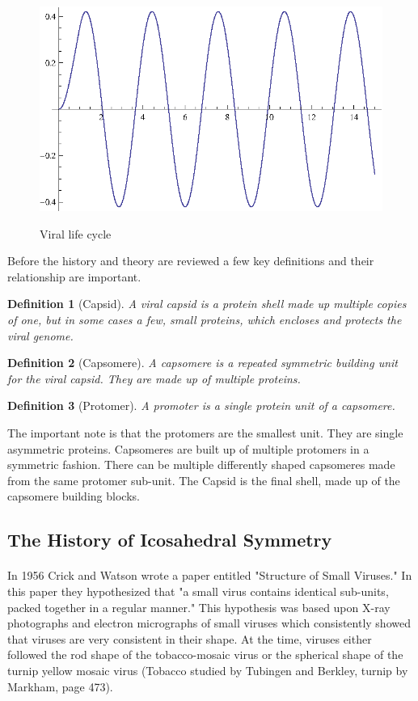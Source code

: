 \documentclass[12pt,letter]{article}
\newtheorem*{definition*}{Definition}
\begin{document}
\begin{figure}[h]
	\caption{Viral life cycle}
	\centering
	\includegraphics{place_holder.eps}
	\label{fig:virus_types}
\end{figure}

Before the history and theory are reviewed a few key definitions and their relationship are important.

\begin{definition*}[Capsid]
A viral capsid is a protein shell made up multiple copies of one, but in some cases a few, small proteins, which encloses and protects the viral genome.
\end{definition*}
\begin{definition*}[Capsomere]
A capsomere is a repeated symmetric building unit for the viral capsid. They are made up of multiple proteins.
\end{definition*}
\begin{definition*}[Protomer]
A promoter is a single protein unit of a capsomere.
\end{definition*}

The important note is that the protomers are the smallest unit. They are single asymmetric proteins. Capsomeres are built up of multiple protomers in a symmetric fashion. There can be multiple differently shaped capsomeres made from the same protomer sub-unit. The Capsid is the final shell, made up of the capsomere building blocks.


\subsection{The History of Icosahedral Symmetry} %

\paragraph{}
In 1956 Crick and Watson wrote a paper entitled "Structure of Small Viruses." In this paper they hypothesized that "a small virus contains identical sub-units, packed together in a regular manner." This hypothesis was based upon X-ray photographs and electron micrographs of small viruses which consistently showed that viruses are very consistent in their shape. At the time, viruses either followed the rod shape of the tobacco-mosaic virus or the spherical shape of the turnip yellow mosaic virus (Tobacco studied by Tubingen and Berkley, turnip by Markham, page 473). \\
\end{document}
